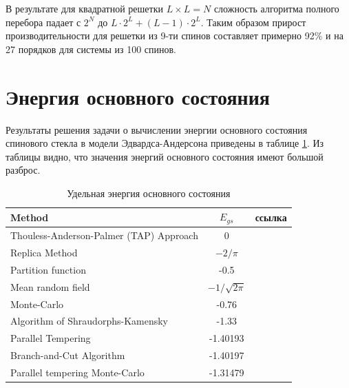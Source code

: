 \documentclass[utf8, babel, sor, jor, amsmath, amssymb, reprint]{elsarticle} %
\begin{document}
В результате для квадратной решетки $L \times L=N$ сложность алгоритма полного перебора падает с $2^{N}$ до $L \cdot 2^L + (L - 1) \cdot 2^L$. Таким образом прирост производительности для решетки из 9-ти спинов составляет примерно 92\% и на 27 порядков для системы из 100 спинов.


\section{Энергия основного состояния}

Результаты решения задачи о вычислении энергии основного состояния спинового стекла в модели Эдвардса-Андерсона приведены в таблице \ref{tab:Egs}. Из таблицы видно, что значения энергий основного состояния  имеют большой разброс.

\begin{table}[h]
	\begin{tabular}{|l|c|l|}
		\hline
		Method                                   & $E_{gs}$                                       & ссылка                                          \\ \hline
		Thouless-Anderson-Palmer (TAP) Approach & 0                                              & \cite{thouless1977solution}    \\ \hline
		Replica Method                            & $-2/\pi$                                       & \cite{sherrington1975solvable} \\ \hline
		Partition function                      & -0.5                                           & \cite{tanaka1980analytic}      \\ \hline
		Mean random field                       & $-1/\sqrt{2\pi}$                               & \cite{klein1976comparison}     \\ \hline
		Monte-Carlo                             & -0.76                                          & \cite{kirkpatrick1978infinite} \\ \hline
		Algorithm of Shraudorphs-Kamensky        & -1.33                                          & \cite{karandashev2019global}   \\ \hline
		Parallel Tempering   & -1.40193                                       & \cite{palmer1999ground}        \\ \hline
		Branch-and-Cut Algorithm              & -1.40197                         
		& \cite{campbell2004energy}      \\ \hline
		
		Parallel tempering Monte-Carlo  & -1.31479                                       & \cite{roma2009ground}          \\ \hline
		
		
		
	\end{tabular}
	\caption{Удельная энергия основного состояния}
	\label{tab:Egs}
\end{table}
\end{document}
